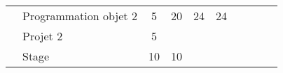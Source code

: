 \begin{tabular}{c|m{6cm}|cm{1cm}|cm{1cm}|cm{1cm}|cm{1cm}|}
 & \color{black} \mbox{Programmation} \mbox{objet} \mbox{2}  & \color{black} 5 & \color{black} 20 & \color{black} 24 & \color{black} 24 \\ \cline{2-6}
 & \cellcolor{couleurClaire} \color{couleurTexte} \mbox{Projet} \mbox{2}  & \cellcolor{couleurClaire} \color{couleurTexte} 5 & \cellcolor{couleurClaire} \color{couleurTexte}  & \cellcolor{couleurClaire} \color{couleurTexte}  & \cellcolor{couleurClaire} \color{couleurTexte}  \\ \cline{2-6}
 & \color{black} \mbox{Stage}  & \color{black} 10 & \color{black} 10 & \color{black}  & \color{black}  \\ \cline{2-6}
\hline
\end{tabular}
